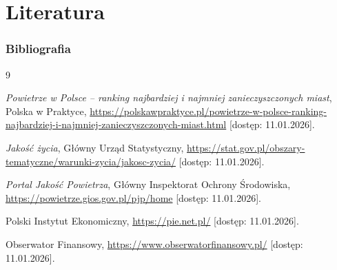 \section{Literatura}

\begin{frame}[allowframebreaks]
    \frametitle{Bibliografia}
    
    \footnotesize 

    \begin{thebibliography}{9}

        \emph{Powietrze w Polsce – ranking najbardziej i najmniej zanieczyszczonych miast}, Polska w Praktyce, \url{https://polskawpraktyce.pl/powietrze-w-polsce-ranking-najbardziej-i-najmniej-zanieczyszczonych-miast.html} [dostęp: 11.01.2026].

        \emph{Jakość życia}, Główny Urząd Statystyczny, \url{https://stat.gov.pl/obszary-tematyczne/warunki-zycia/jakosc-zycia/} [dostęp: 11.01.2026].

        \emph{Portal Jakość Powietrza}, Główny Inspektorat Ochrony Środowiska, \url{https://powietrze.gios.gov.pl/pjp/home} [dostęp: 11.01.2026].

        Polski Instytut Ekonomiczny, \url{https://pie.net.pl/} [dostęp: 11.01.2026].

        Obserwator Finansowy, \url{https://www.obserwatorfinansowy.pl/} [dostęp: 11.01.2026].

    \end{thebibliography}
\end{frame}